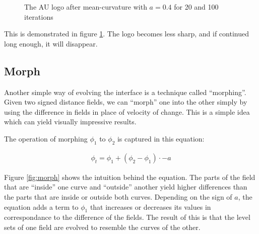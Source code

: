 \begin{figure}[h]
  \centering
  \caption{The AU logo after mean-curvature with $a=0.4$ for 20 and 100 iterations}
  \label{fig:auMean}
\end{figure}



This is demonstrated in figure \ref{fig:auMean}. The logo becomes less
sharp, and if continued long enough, it will disappear. 



\subsection{Morph}
Another simple way of evolving the interface is a technique called
``morphing''. Given two signed distance fields, we can ``morph'' one
into the other simply by using the difference in fields in place of
velocity of change. This is a simple idea which can yield visually
impressive results.

The operation of morphing $\phi_1$ to $\phi_2$ is captured in this
equation:

\begin{align}
\phi_t = \phi_1 + (\phi_2 - \phi_1) \cdot -a
\end{align}


Figure \vref{fig:morph} shows the intuition behind the equation. The
parts of the field that are ``inside'' one curve and ``outside''
another yield higher differences than the parts that are inside or
outside both curves. Depending on the sign of $a$, the equation adds a
term to $\phi_1$ that increases or decreases its values in
correspondance to the difference of the fields. The result of this is
that the level sets of one field are evolved to resemble the curves of
the other.


